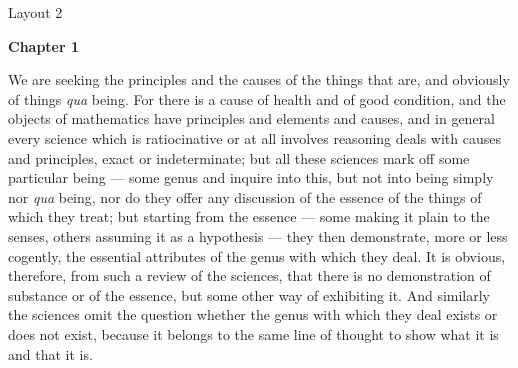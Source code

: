 Layout 2

\textbf{Chapter 1}

We are seeking the principles and the causes of the things that are, and obviously of things \emph{qua} being. For there is a cause of health and of good condition, and the objects of mathematics have principles and elements and causes, and in general every science which is ratiocinative or at all involves reasoning deals with causes and principles, exact or indeterminate; but all these sciences mark off some particular being — some genus and inquire into this, but not into being simply nor \emph{qua} being, nor do they offer any discussion of the essence of the
things of which they treat; but starting from the essence — some making it plain to the senses, others assuming it
as a hypothesis — they then demonstrate, more or less cogently, the essential attributes of the genus with which
they deal. It is obvious, therefore, from such a review of the sciences, that there is no demonstration of substance or of the essence, but some other way of exhibiting it. And similarly the sciences omit the question whether the genus with which they deal exists or does not exist, because it belongs to the same line of thought to show what it is and that it is.

